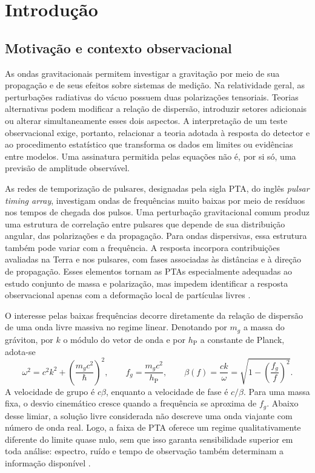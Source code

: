 \chapter{Introdução}
\label{chap:introducao}

\section{Motivação e contexto observacional}

As ondas gravitacionais permitem investigar a gravitação por meio de
sua propagação e de seus efeitos sobre sistemas de medição. Na
relatividade geral, as perturbações radiativas do vácuo possuem duas
polarizações tensoriais. Teorias alternativas podem modificar a relação
de dispersão, introduzir setores adicionais ou alterar simultaneamente
esses dois aspectos. A interpretação de um teste observacional exige,
portanto, relacionar a teoria adotada à resposta do detector e ao
procedimento estatístico que transforma os dados em limites ou
evidências entre modelos. Uma assinatura permitida pelas equações não é,
por si só, uma previsão de amplitude observável.

As redes de temporização de pulsares, designadas pela sigla PTA, do
inglês \emph{pulsar timing array}, investigam ondas de frequências muito
baixas por meio de resíduos nos tempos de chegada dos pulsos. Uma
perturbação gravitacional comum produz uma estrutura de correlação entre
pulsares que depende de sua distribuição angular, das polarizações e da
propagação. Para ondas dispersivas, essa estrutura também pode variar
com a frequência. A resposta incorpora contribuições avaliadas na Terra
e nos pulsares, com fases associadas às distâncias e à direção de
propagação. Esses elementos tornam as PTAs especialmente adequadas ao
estudo conjunto de massa e polarização, mas impedem identificar a
resposta observacional apenas com a deformação local de partículas
livres \autocite{liang2021,cordes2025}.

O interesse pelas baixas frequências decorre diretamente da relação de
dispersão de uma onda livre massiva no regime linear. Denotando por
\(m_g\) a massa do gráviton, por \(k\) o módulo do vetor de onda e por
\(h_{\mathrm P}\) a constante de Planck, adota-se
\begin{equation}
  \omega^2=c^2k^2+\left(\frac{m_gc^2}{\hbar}\right)^2,
  \qquad f_g=\frac{m_gc^2}{h_{\mathrm P}},
  \qquad \beta(f)=\frac{ck}{\omega}
  =\sqrt{1-\left(\frac{f_g}{f}\right)^2}.
  \label{eq:intro-dispersao}
\end{equation}
A velocidade de grupo é \(c\beta\), enquanto a velocidade de fase é
\(c/\beta\). Para uma massa fixa, o desvio cinemático cresce quando a
frequência se aproxima de \(f_g\). Abaixo desse limiar, a solução livre
considerada não descreve uma onda viajante com número de onda real.
Logo, a faixa de PTA oferece um regime qualitativamente diferente do
limite quase nulo, sem que isso garanta sensibilidade superior em toda
análise: espectro, ruído e tempo de observação também determinam a
informação disponível \autocite{liang2021,wu2024}.

